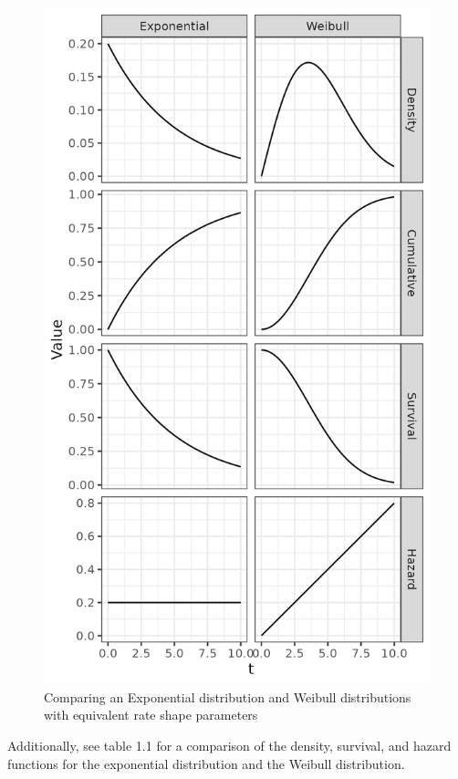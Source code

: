 \documentclass[12pt]{./styles/outhesis}
\begin{document}
\begin{figure}
\centering
\includegraphics{figures/weiExpFig.png}
\caption{Comparing an Exponential distribution and Weibull distributions
with equivalent rate shape parameters}
\end{figure}

Additionally, see table 1.1 for a comparison of the density, survival,
and hazard functions for the exponential distribution and the Weibull
distribution.
\end{document}
